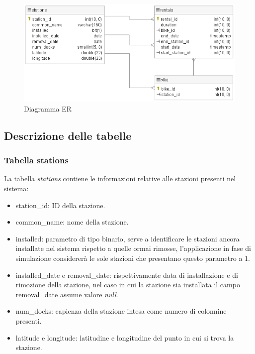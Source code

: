 \documentclass[a4paper, 12pt]{article}
\begin{document}
\begin{figure}
\caption{Diagramma ER}
\label{diagramer}
\hfill \includegraphics[width=\textwidth]{resources/images/DiagrammaER.png} \hspace*{\fill}
\end{figure}	

	\subsection{Descrizione delle tabelle}

	\subsubsection{Tabella stations}

	La tabella \textit{stations} contiene le informazioni relative alle stazioni presenti nel sistema:
	
	\begin{itemize}
		\item station\_id: ID della stazione.
		\item common\_name: nome della stazione.
		\item installed: parametro di tipo binario, serve a identificare le stazioni ancora installate nel sistema rispetto a quelle ormai rimosse, l'applicazione in fase di simulazione considererà le sole stazioni che presentano questo parametro a 1.
		\item installed\_date e removal\_date: rispettivamente data di installazione e di rimozione della stazione, nel caso in cui la stazione sia installata il campo removal\_date assume valore \textit{null}.
		\item num\_docks: capienza della stazione intesa come numero di colonnine presenti.
		\item latitude e longitude: latitudine e longitudine del punto in cui si trova la stazione.
	\end{itemize}
\end{document}
